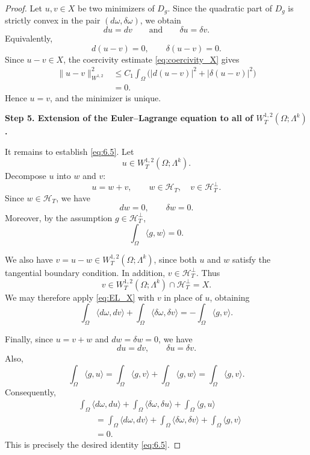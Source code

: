 \begin{proof}
Let $u,v\in X$ be two minimizers of $D_g$. Since the quadratic part
of $D_g$ is strictly convex in the pair $(d\omega,\delta\omega)$,
we obtain
\[
    du=dv
    \qquad\text{and}\qquad
    \delta u=\delta v.
\]
Equivalently,
\[
    d(u-v)=0,\qquad
    \delta(u-v)=0.
\]
Since $u-v\in X$, the coercivity estimate
\eqref{eq:coercivity_X} gives
\[
    \begin{aligned}
    \|u-v\|_{W^{1,2}}^2
    &\leq
    C_1\int_\Omega
    \bigl(|d(u-v)|^2+|\delta(u-v)|^2\bigr)\\
    &=0.
    \end{aligned}
\]
Hence $u=v$, and the minimizer is unique.

\medskip
\noindent\textbf{Step 5. Extension of the Euler--Lagrange equation to
all of $W_T^{1,2}(\Omega;\Lambda^k)$.}

It remains to establish \eqref{eq:6.5}. Let
\[
    u\in W_T^{1,2}(\Omega;\Lambda^k).
\]
Decompose $u$ into $w$ and $v$:
\[
    u=w+v,
    \qquad
    w\in\mathcal H_T,\quad
    v\in\mathcal H_T^\perp.
\]
Since $w\in\mathcal H_T$, we have
\[
    dw=0,\qquad\delta w=0.
\]
Moreover, by the assumption $g\in\mathcal H_T^\perp$,
\[
    \int_\Omega\langle g,w\rangle=0.
\]

We also have $v=u-w\in W_T^{1,2}(\Omega;\Lambda^k)$, since both
$u$ and $w$ satisfy the tangential boundary condition. In addition,
$v\in\mathcal H_T^\perp$. Thus
\[
    v\in W_T^{1,2}(\Omega;\Lambda^k)
    \cap\mathcal H_T^\perp=X.
\]
We may therefore apply \eqref{eq:EL_X} with $v$ in place of $u$,
obtaining
\[
    \int_\Omega\langle d\omega,dv\rangle
    +\int_\Omega\langle\delta\omega,\delta v\rangle
    =
    -\int_\Omega\langle g,v\rangle.
\]

Finally, since $u=v+w$ and $dw=\delta w=0$, we have
\[
    du=dv,\qquad\delta u=\delta v.
\]
Also,
\[
    \int_\Omega\langle g,u\rangle
    =
    \int_\Omega\langle g,v\rangle
    +\int_\Omega\langle g,w\rangle
    =
    \int_\Omega\langle g,v\rangle.
\]
Consequently,
\[
    \begin{aligned}
    &\int_\Omega\langle d\omega,du\rangle
    +\int_\Omega\langle\delta\omega,\delta u\rangle
    +\int_\Omega\langle g,u\rangle\\
    &\qquad=
    \int_\Omega\langle d\omega,dv\rangle
    +\int_\Omega\langle\delta\omega,\delta v\rangle
    +\int_\Omega\langle g,v\rangle\\
    &\qquad=0.
    \end{aligned}
\]
This is precisely the desired identity \eqref{eq:6.5}.
\end{proof}

